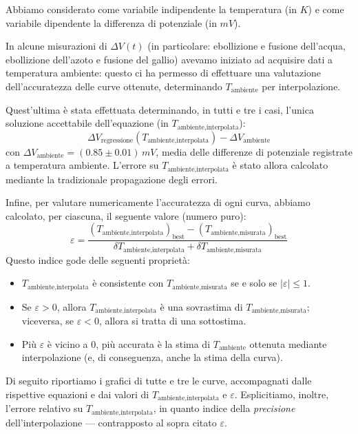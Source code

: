 \documentclass{article}
\begin{document}
Abbiamo considerato come variabile indipendente la temperatura (in $\unit{K}$)
e come variabile dipendente la differenza di potenziale (in $\unit{mV}$).

\vspace{3mm}

In alcune misurazioni di $\Delta V(t)$ (in particolare:
ebollizione e fusione dell'acqua, ebollizione dell'azoto e
fusione del gallio) avevamo iniziato
ad acquisire dati a temperatura ambiente: questo ci ha
permesso di effettuare una valutazione dell'accuratezza
delle curve ottenute, determinando $T_\text{ambiente}$
per interpolazione.

Quest'ultima è stata effettuata determinando, in tutti e tre i casi,
l'unica soluzione accettabile dell'equazione (in $T_\text{ambiente,interpolata}$):
\[
  \Delta V_\text{regressione}(T_\text{ambiente,interpolata})
  - \Delta V_\text{ambiente}
\]
con $\Delta V_\text{ambiente} = (0.85\pm0.01)\,\unit{mV}$,
media delle differenze di potenziale registrate a temperatura
ambiente.
L'errore su $T_\text{ambiente,interpolata}$ è stato allora calcolato
mediante la tradizionale propagazione degli errori.

\vspace{3mm}

Infine, per valutare numericamente l'accuratezza di ogni curva,
abbiamo calcolato, per ciascuna, il seguente valore (numero puro):
\[
  \varepsilon = \frac{
    \left(T_\text{ambiente,interpolata}\right)_\text{best} -
    \left(T_\text{ambiente,misurata}\right)_\text{best}
  }{\delta T_\text{ambiente,interpolata} + \delta T_\text{ambiente,misurata}}
\]
Questo indice gode delle seguenti proprietà:
\begin{itemize}
  \item $T_\text{ambiente,interpolata}$ è consistente con
    $T_\text{ambiente,misurata}$ se e solo se $\left|\varepsilon\right|\le 1$.
  \item Se $\varepsilon>0$, allora $T_\text{ambiente,interpolata}$ è una
    sovrastima di $T_\text{ambiente,misurata}$; viceversa, se $\varepsilon<0$,
    allora si tratta di una sottostima.
  \item Più $\varepsilon$ è vicino a $0$, più accurata è la stima di
    $T_\text{ambiente}$ ottenuta mediante interpolazione (e, di conseguenza,
    anche la stima della curva).
\end{itemize}

\vspace{3mm}

Di seguito riportiamo i grafici di tutte e tre le curve, accompagnati dalle
rispettive equazioni e dai valori di $T_\text{ambiente,interpolata}$ e
$\varepsilon$. Esplicitiamo, inoltre, l'errore relativo su
$T_\text{ambiente,interpolata}$, in quanto indice della \emph{precisione}
dell'interpolazione — contrapposto al sopra citato $\varepsilon$.
\end{document}
